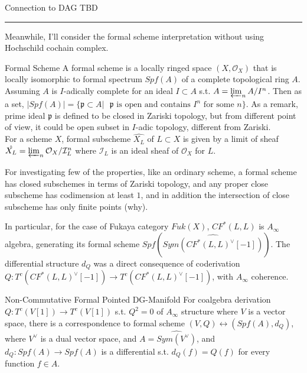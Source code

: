 \documentclass{article}
\begin{document}
\begin{definition}{Connection to DAG}{}
TBD
\end{definition}



\vspace{0.5cm}
\noindent\rule{\textwidth}{0.4pt}
\vspace{0.5cm}


Meanwhile, I'll consider the formal scheme interpretation without using Hochschild cochain complex.


\begin{definition}{Formal Scheme}{}
A formal scheme is a locally ringed space $(X,\mathcal{O}_X)$ that is locally isomorphic to formal spectrum $Spf(A)$
of a complete topological ring $A$. Assuming $A$ is $I$-adically complete for an ideal $I\subset A$ s.t. $A = \varprojlim_{n} A/I^n$.
Then as a set, $|Spf(A)| = \{ \mathfrak{p} \subset A  | \text{ $\mathfrak{p}$ is open and contains $I^n$ for some $n$} \}$. 
As a remark, prime ideal $\mathfrak{p}$ is defined to be closed in Zariski topology, but from different point of view,
it could be open subset in $I$-adic topology, different from Zariski. \\

For a scheme $X$, formal subscheme $\hat{X_L}$ of $L\subset X$ is given by a limit of sheaf 
$\hat{X_L} = \varprojlim_{n} \mathcal{O}_X / \mathcal{I}_L^n$ where $\mathcal{I}_L$ is an ideal sheaf of $\mathcal{O}_X$ for $L$.
\end{definition}

\noindent
For investigating few of the properties, like an ordinary scheme, a formal scheme has closed subschemes in terms of Zariski topology, 
and any proper close subscheme has codimension at least $1$, 
and in addition the intersection of close subscheme has only finite points (why).\\

\noindent


\noindent
In particular, for the case of Fukaya category $Fuk(X)$, $CF^*(L,L)$ is $A_\infty$ algebra, 
generating its formal scheme $Spf(\hat{Sym( CF^*(L,L)^\vee[-1])})$.
The differential structure $d_Q$ was a direct consequence of coderivation $Q: T^c (CF^*(L,L)^\vee[-1]) \to T^c (CF^*(L,L)^\vee[-1])$,
with $A_\infty$ coherence. \\


\begin{example}{Non-Commutative Formal Pointed DG-Manifold}{}
For coalgebra derivation $Q: T^c (V[1]) \to T^c (V[1])$ s.t. $Q^2=0$ of $A_\infty$ structure where $V$ is a vector space,
there is a correspondence to formal scheme $(V,Q) \leftrightarrow (Spf(A), d_Q)$, where $V^\vee$ is a dual vector space,
and $A = \hat{Sym(V^\vee)}$, and $d_Q: Spf(A) \to Spf(A)$ is a differential s.t. $d_Q (f) = Q(f)$ for every function $f\in A$.
\end{example}
\end{document}
